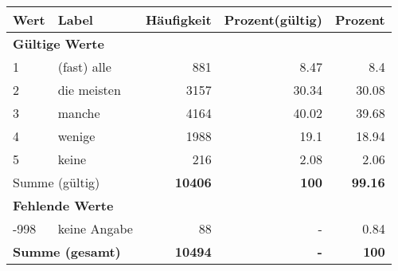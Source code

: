      \begin{longtable}{lXrrr}
     \toprule
     \textbf{Wert} & \textbf{Label} & \textbf{Häufigkeit} & \textbf{Prozent(gültig)} & \textbf{Prozent} \\
     \endhead
     \midrule
     \multicolumn{5}{l}{\textbf{Gültige Werte}}\\

     1 &
     \multicolumn{1}{X}{ (fast) alle   } &


       \num{881} &
       \num[round-mode=places,round-precision=2]{8,47} &
         \num[round-mode=places,round-precision=2]{8,4} \\

     2 &
     \multicolumn{1}{X}{ die meisten   } &


       \num{3157} &
       \num[round-mode=places,round-precision=2]{30,34} &
         \num[round-mode=places,round-precision=2]{30,08} \\

     3 &
     \multicolumn{1}{X}{ manche   } &


       \num{4164} &
       \num[round-mode=places,round-precision=2]{40,02} &
         \num[round-mode=places,round-precision=2]{39,68} \\

     4 &
     \multicolumn{1}{X}{ wenige   } &


       \num{1988} &
       \num[round-mode=places,round-precision=2]{19,1} &
         \num[round-mode=places,round-precision=2]{18,94} \\

     5 &
     \multicolumn{1}{X}{ keine   } &


       \num{216} &
       \num[round-mode=places,round-precision=2]{2,08} &
         \num[round-mode=places,round-precision=2]{2,06} \\
     \midrule
     \multicolumn{2}{l}{Summe (gültig)} &
       \textbf{\num{10406}} &
     \textbf{100} &
       \textbf{\num[round-mode=places,round-precision=2]{99,16}} \\
     \multicolumn{5}{l}{\textbf{Fehlende Werte}}\\
       -998 &
       keine Angabe &
         \num{88} &
        - &
         \num[round-mode=places,round-precision=2]{0,84} \\
     \midrule
     \multicolumn{2}{l}{\textbf{Summe (gesamt)}} &
          \textbf{\num{10494}} &
        \textbf{-} &
        \textbf{100} \\
     \bottomrule
     \end{longtable}
     
